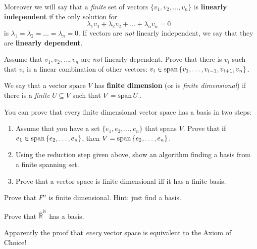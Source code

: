 Moreover we will say that a \textit{finite} set of vectors $\{v_1, v_2, \dots, v_n\}$ is \textbf{linearly independent} if the only solution for
$$\lambda_1v_1+\lambda_2v_2+\dots+\lambda_nv_n=0$$
is $\lambda_1=\lambda_2=\dots=\lambda_n=0$. If vectors are \textit{not} linearly independent, we say that they are \textbf{linearly dependent}.

\begin{prob}
  Assume that $v_1, v_2, \dots, v_n$ are \textit{not} linearly dependent. Prove that there is $v_i$ such that $v_i$ is a linear combination of other vectors:
  $v_i \in \text{span\,} \{v_1, \dots, v_{i-1}, v_{i+1}, v_n\}$.
\end{prob}

We say that a vector space $V$ has \textbf{finite dimension} (or is \textit{finite dimensional}) if there is a \textit{finite} $U\subseteq V$ such that $V=\text{span\,} U$.
\begin{prob}
  You can prove that every finite dimensional vector space has a basis in two steps:
    \begin{enumerate}
      \item Assume that you have a set $\{e_1, e_2,\dots, e_n\}$ that spans $V$. Prove that if $e_1\in \text{span\,} \{e_2,\dots, e_n\}$, then $V=\text{span\,} \{e_2,\dots, e_n\}$.
      \item Using the reduction step given above, show an algorithm finding a basis from a finite spanning set.
      \item Prove that a vector space is finite dimensional iff it has a finite basis.
    \end{enumerate}
\end{prob}

\begin{prob}
  Prove that $F^n$ is finite dimensional. Hint: just find a basis.
\end{prob}

\begin{prob}
  Prove that $\hat{\mathbb R}^{\mathbb N}$ has a basis.
\end{prob}

Apparently the proof that \textit{every} vector space is equivalent to the Axiom of Choice!

